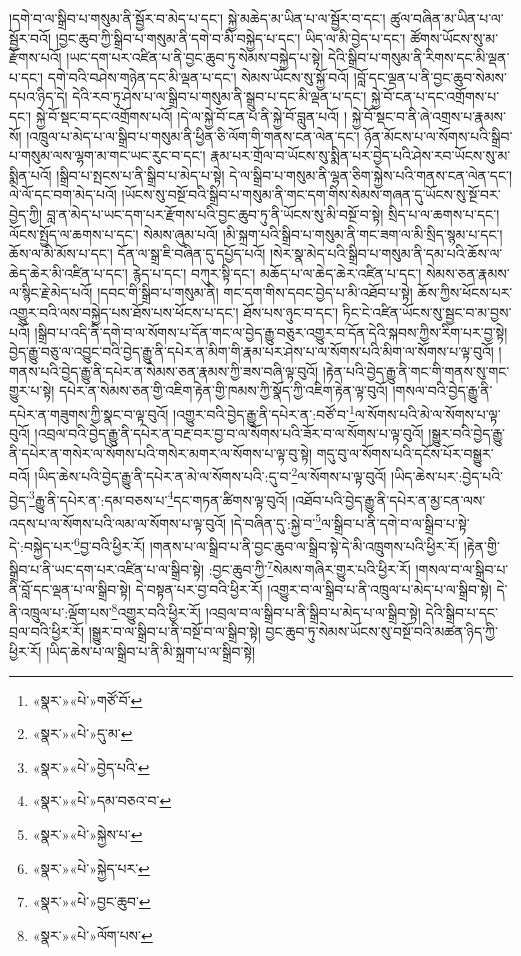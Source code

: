 །དགེ་བ་ལ་སྒྲིབ་པ་གསུམ་ནི་སྦྱོར་བ་མེད་པ་དང་། སྐྱེ་མཆེད་མ་ཡིན་པ་ལ་སྦྱོར་བ་དང་། ཚུལ་བཞིན་མ་ཡིན་པ་ལ་སྦྱོར་བའོ། །བྱང་ཆུབ་ཀྱི་སྒྲིབ་པ་གསུམ་ནི་དགེ་བ་མི་བསྐྱེད་པ་དང་། ཡིད་ལ་མི་བྱེད་པ་དང་། ཚོགས་ཡོངས་སུ་མ་རྫོགས་པའོ། །ཡང་དག་པར་འཛིན་པ་ནི་བྱང་ཆུབ་ཏུ་སེམས་བསྐྱེད་པ་སྟེ། དེའི་སྒྲིབ་པ་གསུམ་ནི་རིགས་དང་མི་ལྡན་པ་དང་། དགེ་བའི་བཤེས་གཉེན་དང་མི་ལྡན་པ་དང་། སེམས་ཡོངས་སུ་སྐྱོ་བའོ། །བློ་དང་ལྡན་པ་ནི་བྱང་ཆུབ་སེམས་དཔའ་ཉིད་དེ། དེའི་རབ་ཏུ་ཤེས་པ་ལ་སྒྲིབ་པ་གསུམ་ནི་སྒྲུབ་པ་དང་མི་ལྡན་པ་དང་། སྐྱེ་བོ་ངན་པ་དང་འགྲོགས་པ་དང་། སྐྱེ་བོ་སྡང་བ་དང་འགྲོགས་པའོ། །དེ་ལ་སྐྱེ་བོ་ངན་པ་ནི་སྐྱེ་བོ་བླུན་པའོ། །
སྐྱེ་བོ་སྡང་བ་ནི་ཞེ་འགྲས་པ་རྣམས་སོ། །འཁྲུལ་པ་མེད་པ་ལ་སྒྲིབ་པ་གསུམ་ནི་ཕྱིན་ཅི་ལོག་གི་གནས་ངན་ལེན་དང་། ཉོན་མོངས་པ་ལ་སོགས་པའི་སྒྲིབ་པ་གསུམ་ལས་ལྷག་མ་གང་ཡང་རུང་བ་དང་། རྣམ་པར་གྲོལ་བ་ཡོངས་སུ་སྨིན་པར་བྱེད་པའི་ཤེས་རབ་ཡོངས་སུ་མ་སྨིན་པའོ། །སྒྲིབ་པ་སྤངས་པ་ནི་སྒྲིབ་པ་མེད་པ་སྟེ། དེ་ལ་སྒྲིབ་པ་གསུམ་ནི་ལྷན་ཅིག་སྐྱེས་པའི་གནས་ངན་ལེན་དང་། ལེ་ལོ་དང་བག་མེད་པའོ། །ཡོངས་སུ་བསྔོ་བའི་སྒྲིབ་པ་གསུམ་ནི་གང་དག་གིས་སེམས་གཞན་དུ་ཡོངས་སུ་སྔོ་བར་བྱེད་ཀྱི། བླ་ན་མེད་པ་ཡང་དག་པར་རྫོགས་པའི་བྱང་ཆུབ་ཏུ་ནི་ཡོངས་སུ་མི་བསྔོ་བ་སྟེ། སྲིད་པ་ལ་ཆགས་པ་དང་། ལོངས་སྤྱོད་ལ་ཆགས་པ་དང་། སེམས་ཞུམ་པའོ། །མི་སྐྲག་པའི་སྒྲིབ་པ་གསུམ་ནི་གང་ཟག་ལ་མི་སྲིད་སྙམ་པ་དང་། ཆོས་ལ་མི་མོས་པ་དང་། དོན་ལ་སྒྲ་ཇི་བཞིན་དུ་དཔྱོད་པའོ། །སེར་སྣ་མེད་པའི་སྒྲིབ་པ་གསུམ་ནི་དམ་པའི་ཆོས་ལ་ཆེད་ཆེར་མི་འཛིན་པ་དང་། རྙེད་པ་དང་། བཀུར་སྟི་དང་། མཆོད་པ་ལ་ཆེད་ཆེར་འཛིན་པ་དང་། སེམས་ཅན་རྣམས་ལ་སྙིང་རྗེ་མེད་པའོ། །དབང་གི་སྒྲིབ་པ་གསུམ་ནི། གང་དག་གིས་དབང་བྱེད་པ་མི་འཐོབ་པ་སྟེ། ཆོས་ཀྱིས་ཕོངས་པར་འགྱུར་བའི་ལས་བསྐྱེད་པས་ཐོས་པས་ཕོངས་པ་དང་། ཐོས་པས་ཉུང་བ་དང་། ཏིང་ངེ་འཛིན་ཡོངས་སུ་སྦྱང་བ་མ་བྱས་པའོ། །སྒྲིབ་པ་འདི་ནི་དགེ་བ་ལ་སོགས་པ་དོན་གང་ལ་བྱེད་རྒྱུ་བཅུར་འགྱུར་བ་དོན་དེའི་སྐབས་ཀྱིས་རིག་པར་བྱ་སྟེ། བྱེད་རྒྱུ་བཅུ་ལ་འབྱུང་བའི་བྱེད་རྒྱུ་ནི་དཔེར་ན་མིག་གི་རྣམ་པར་ཤེས་པ་ལ་སོགས་པའི་མིག་ལ་སོགས་པ་ལྟ་བུའོ། །གནས་པའི་བྱེད་རྒྱུ་ནི་དཔེར་ན་སེམས་ཅན་རྣམས་ཀྱི་ཟས་བཞི་ལྟ་བུའོ། །རྟེན་པའི་བྱེད་རྒྱུ་ནི་གང་གི་གནས་སུ་གང་གྱུར་པ་སྟེ། དཔེར་ན་སེམས་ཅན་གྱི་འཇིག་རྟེན་གྱི་ཁམས་ཀྱི་སྣོད་ཀྱི་འཇིག་རྟེན་ལྟ་བུའོ། །གསལ་བའི་བྱེད་རྒྱུ་ནི་དཔེར་ན་གཟུགས་ཀྱི་སྣང་བ་ལྟ་བུའོ། །འགྱུར་བའི་བྱེད་རྒྱུ་ནི་དཔེར་ན་:བཙོ་བ་\footnote{«སྣར་»«པེ་»གཙོ་བོ་}ལ་སོགས་པའི་མེ་ལ་སོགས་པ་ལྟ་བུའོ། །འབྲལ་བའི་བྱེད་རྒྱུ་ནི་དཔེར་ན་བརྔ་བར་བྱ་བ་ལ་སོགས་པའི་ཟོར་བ་ལ་སོགས་པ་ལྟ་བུའོ། །སྒྱུར་བའི་བྱེད་རྒྱུ་ནི་དཔེར་ན་གསེར་ལ་སོགས་པའི་གསེར་མགར་ལ་སོགས་པ་ལྟ་བུ་སྟེ། གདུ་བུ་ལ་སོགས་པའི་དངོས་པོར་བསྒྱུར་བའོ། །ཡིད་ཆེས་པའི་བྱེད་རྒྱུ་ནི་དཔེར་ན་མེ་ལ་སོགས་པའི་:དུ་བ་\footnote{«སྣར་»«པེ་»དུ་མ་}ལ་སོགས་པ་ལྟ་བུའོ། །ཡིད་ཆེས་པར་:བྱེད་པའི་བྱེད་\footnote{«སྣར་»«པེ་»བྱེད་པའི་}རྒྱུ་ནི་དཔེར་ན་:དམ་བཅས་པ་\footnote{«སྣར་»«པེ་»དམ་བཅའ་བ་}དང་གཏན་ཚིགས་ལྟ་བུའོ། །འཐོབ་པའི་བྱེད་རྒྱུ་ནི་དཔེར་ན་མྱ་ངན་ལས་འདས་པ་ལ་སོགས་པའི་ལམ་ལ་སོགས་པ་ལྟ་བུའོ། །དེ་བཞིན་དུ་:སྐྱེ་བ་\footnote{«སྣར་»«པེ་»སྐྱེས་པ་}ལ་སྒྲིབ་པ་ནི་དགེ་བ་ལ་སྒྲིབ་པ་སྟེ་དེ་:བསྐྱེད་པར་\footnote{«སྣར་»«པེ་»སྐྱེད་པར་}བྱ་བའི་ཕྱིར་རོ། །གནས་པ་ལ་སྒྲིབ་པ་ནི་བྱང་ཆུབ་ལ་སྒྲིབ་སྟེ་དེ་མི་འཁྲུགས་པའི་ཕྱིར་རོ། །རྟེན་གྱི་སྒྲིབ་པ་ནི་ཡང་དག་པར་འཛིན་པ་ལ་སྒྲིབ་སྟེ། :བྱང་ཆུབ་ཀྱི་\footnote{«སྣར་»«པེ་»བྱང་ཆུབ་}སེམས་གཞིར་གྱུར་པའི་ཕྱིར་རོ། །གསལ་བ་ལ་སྒྲིབ་པ་ནི་བློ་དང་ལྡན་པ་ལ་སྒྲིབ་སྟེ། དེ་བསྟན་པར་བྱ་བའི་ཕྱིར་རོ། །འགྱུར་བ་ལ་སྒྲིབ་པ་ནི་འཁྲུལ་པ་མེད་པ་ལ་སྒྲིབ་སྟེ། དེ་ནི་འཁྲུལ་པ་:ལྡོག་པས་\footnote{«སྣར་»«པེ་»ལོག་པས་}འགྱུར་བའི་ཕྱིར་རོ། །འབྲལ་བ་ལ་སྒྲིབ་པ་ནི་སྒྲིབ་པ་མེད་པ་ལ་སྒྲིབ་སྟེ། དེའི་སྒྲིབ་པ་དང་བྲལ་བའི་ཕྱིར་རོ། །སྒྱུར་བ་ལ་སྒྲིབ་པ་ནི་བསྔོ་བ་ལ་སྒྲིབ་སྟེ། བྱང་ཆུབ་ཏུ་སེམས་ཡོངས་སུ་བསྔོ་བའི་མཚན་ཉིད་ཀྱི་ཕྱིར་རོ། །ཡིད་ཆེས་པ་ལ་སྒྲིབ་པ་ནི་མི་སྐྲག་པ་ལ་སྒྲིབ་སྟེ། 
